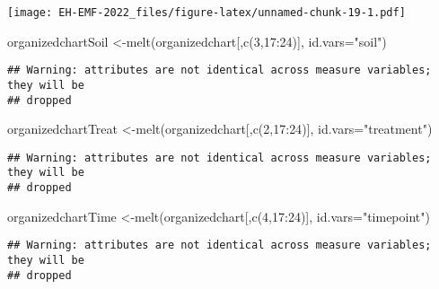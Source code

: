 \documentclass[
]{article}
\newenvironment{Shaded}{\begin{snugshade}}{\end{snugshade}}
\newcommand{\AttributeTok}[1]{\textcolor[rgb]{0.77,0.63,0.00}{#1}}
\newcommand{\DecValTok}[1]{\textcolor[rgb]{0.00,0.00,0.81}{#1}}
\newcommand{\FunctionTok}[1]{\textcolor[rgb]{0.00,0.00,0.00}{#1}}
\newcommand{\NormalTok}[1]{#1}
\newcommand{\OtherTok}[1]{\textcolor[rgb]{0.56,0.35,0.01}{#1}}
\newcommand{\SpecialCharTok}[1]{\textcolor[rgb]{0.00,0.00,0.00}{#1}}
\newcommand{\StringTok}[1]{\textcolor[rgb]{0.31,0.60,0.02}{#1}}
\begin{document}
\texttt{[image: EH-EMF-2022\_files/figure-latex/unnamed-chunk-19-1.pdf]}

\begin{Shaded}
\begin{Highlighting}[]
\NormalTok{organizedchartSoil }\OtherTok{\textless{}{-}}\FunctionTok{melt}\NormalTok{(organizedchart[,}\FunctionTok{c}\NormalTok{(}\DecValTok{3}\NormalTok{,}\DecValTok{17}\SpecialCharTok{:}\DecValTok{24}\NormalTok{)], }\AttributeTok{id.vars=}\StringTok{"soil"}\NormalTok{)}
\end{Highlighting}
\end{Shaded}

\begin{verbatim}
## Warning: attributes are not identical across measure variables; they will be
## dropped
\end{verbatim}

\begin{Shaded}
\begin{Highlighting}[]
\NormalTok{organizedchartTreat }\OtherTok{\textless{}{-}}\FunctionTok{melt}\NormalTok{(organizedchart[,}\FunctionTok{c}\NormalTok{(}\DecValTok{2}\NormalTok{,}\DecValTok{17}\SpecialCharTok{:}\DecValTok{24}\NormalTok{)], }\AttributeTok{id.vars=}\StringTok{"treatment"}\NormalTok{)}
\end{Highlighting}
\end{Shaded}

\begin{verbatim}
## Warning: attributes are not identical across measure variables; they will be
## dropped
\end{verbatim}

\begin{Shaded}
\begin{Highlighting}[]
\NormalTok{organizedchartTime }\OtherTok{\textless{}{-}}\FunctionTok{melt}\NormalTok{(organizedchart[,}\FunctionTok{c}\NormalTok{(}\DecValTok{4}\NormalTok{,}\DecValTok{17}\SpecialCharTok{:}\DecValTok{24}\NormalTok{)], }\AttributeTok{id.vars=}\StringTok{"timepoint"}\NormalTok{)}
\end{Highlighting}
\end{Shaded}

\begin{verbatim}
## Warning: attributes are not identical across measure variables; they will be
## dropped
\end{verbatim}
\end{document}
